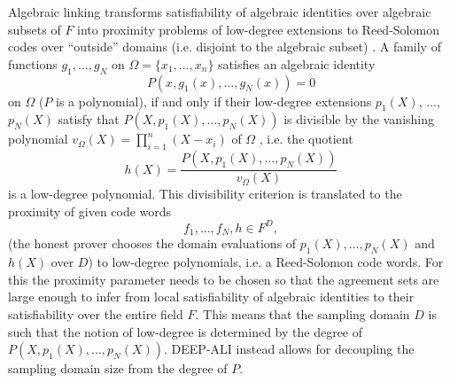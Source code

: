 \documentclass[11pt,article,oneside]{memoir}
\theoremstyle{definition}
\theoremstyle{remark}
\begin{document}
Algebraic linking transforms satisfiability of algebraic identities over algebraic subsets of $F$ into proximity problems of low-degree extensions to Reed-Solomon codes over “outside” domains (i.e. disjoint to the algebraic subset) . 
A family of functions $g_1,\ldots, g_N$ on $\Omega =\{x_1,...,x_n\}$  satisfies an algebraic identity 
\[
P(x, g_1(x),\ldots, g_N(x)) = 0  
\] 
on $\Omega$ ($P$ is a polynomial), if and only if their low-degree extensions $p_1(X)$, $\ldots$, $p_N(X)$ satisfy that $P(X, p_1(X), \ldots, p_N(X))$ is divisible by the vanishing polynomial $v_\Omega(X)=\prod_{i=1}^n (X-x_i)$ of $\Omega$ , i.e. the quotient 
\[
h(X)= \frac{P(X, p_1(X),..., p_N(X))}{v_\Omega(X)} 
\]
is a low-degree polynomial. 
This divisibility criterion is translated to the proximity of given code words 
\[
f_1,..., f_N, h\in F^D,
\]
(the honest prover chooses the domain evaluations of $p_1(X),\ldots, p_N(X)$ and $h(X)$ over $D$) to low-degree polynomials, i.e. a Reed-Solomon code words\footnotemark.
%
For this the proximity parameter needs to be chosen so that the agreement sets are large enough to infer from local satisfiability of algebraic identities to their satisfiability over the entire field $F$. 
This means that the sampling domain $D$ is such that the notion of low-degree is determined by the degree of $P(X,p_1(X),..., p_N(X))$. 
DEEP-ALI instead allows for decoupling the sampling domain size from the degree of $P$. 
\end{document}

